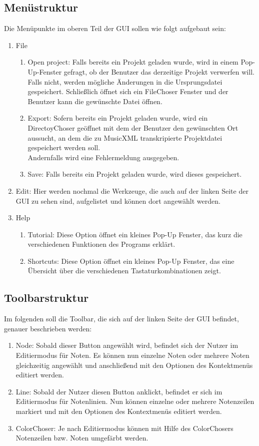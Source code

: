 \documentclass[10pt, paper = a4, oneside,final]{article}
\begin{document}
\subsection{Menüstruktur}
Die Menüpunkte im oberen Teil der GUI sollen wie folgt aufgebaut sein:
\begin{enumerate}[label=$\circ$]
	\item File
	\begin{enumerate}[label=$\circ$]
		\item Open project: Falls bereits ein Projekt geladen wurde, wird in einem Pop-Up-Fenster gefragt, ob der Benutzer das derzeitige Projekt verwerfen will. Falls nicht, werden mögliche Änderungen in die Ursprungsdatei gespeichert. Schließlich öffnet sich ein FileChoser Fenster und der Benutzer kann die gewünschte Datei öffnen.
		\item Export: Sofern bereits ein Projekt geladen wurde, wird ein DirectoyChoser geöffnet mit dem der Benutzer den gewünschten Ort aussucht, an dem die zu MusicXML transkripierte Projektdatei gespeichert werden soll. \\
		Andernfalls wird eine Fehlermeldung ausgegeben.
		\item Save: Falls bereits ein Projekt geladen wurde, wird dieses gespeichert. 
	\end{enumerate}
	\item Edit: Hier werden nochmal die Werkzeuge, die auch auf der linken Seite der GUI zu sehen sind, aufgelistet und können dort angewählt werden.
	\item Help
	\begin{enumerate}[label=$\circ$]
		\item Tutorial: Diese Option öffnet ein kleines Pop-Up Fenster, das kurz die verschiedenen Funktionen des Programs erklärt.
		\item Shortcuts: Diese Option öffnet ein kleines Pop-Up Fenster, das eine Übersicht über die verschiedenen Tastaturkombinationen zeigt.
	\end{enumerate}
\end{enumerate}

\subsection{Toolbarstruktur}
Im folgenden soll die Toolbar, die sich auf der linken Seite der GUI befindet, genauer beschrieben werden:
\begin{enumerate}[label=$\circ$]
	\item Node: Sobald dieser Button angewählt wird, befindet sich der Nutzer im Editiermodus für Noten. Es können nun einzelne Noten oder mehrere Noten gleichzeitig angewählt und anschließend mit den Optionen des Kontektmenüs editiert werden.
	\item Line: Sobald der Nutzer diesen Button anklickt, befindet er sich im Editiermodus für Notenlinien. Nun können einzelne oder mehrere Notenzeilen markiert und mit den Optionen des Kontextmenüs editiert werden.
	\item ColorChoser: Je nach Editiermodus können mit Hilfe des ColorChosers Notenzeilen bzw. Noten umgefärbt werden.
\end{enumerate}
\end{document}
